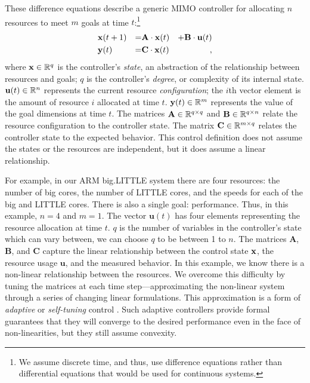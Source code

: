 These difference equations describe a generic MIMO controller for
allocating $n$ resources to meet $m$ goals at time $t$:\footnote{We
  assume discrete time, and thus, use difference equations rather than
  differential equations that would be used for continuous systems.}
\begin{equation}
\begin{aligned}
&\mathbf{x}(t+1) &=& \mathbf{A} \cdot \mathbf{x}(t)& + \mathbf{B} \cdot \mathbf{u}(t)\\
&\mathbf{y}(t)   &=& \mathbf{C} \cdot \mathbf{x}(t)&,
\end{aligned}
\label{eqn:system:mimo}
\end{equation}
where $\mathbf{x} \in \mathbb{R}^{q}$ is the controller's \emph{state}, an abstraction
of the relationship between resources and goals; $q$ is the
controller's \emph{degree}, or complexity of its internal state.
$\mathbf{u}(t) \in \mathbb{R}^n$ represents the current resource
\emph{configuration}; \ie{} the $i$th vector element is the amount of
resource $i$ allocated at time $t$.  $\mathbf{y}(t) \in \mathbb{R}^{m}$ represents the
value of the goal dimensions at time $t$. The matrices $\mathbf{A} \in
\mathbb{R}^{q \times q}$ and $\mathbf{B} \in \mathbb{R}^{q \times n}$ relate the
resource configuration to the controller state.  The matrix
$\mathbf{C} \in \mathbb{R}^{m \times q}$ relates the controller state to the
expected behavior.  This control definition does not assume the states
or the resources are independent, but it does assume a linear
relationship.

For example, in our ARM big.LITTLE system there are four resources:
the number of big cores, the number of LITTLE cores, and the speeds
for each of the big and LITTLE cores.  There is also a single goal:
performance.  Thus, in this example, $n=4$ and $m=1$. The vector
$\mathbf{u}(t)$ has four elements representing the resource allocation
at time $t$. $q$ is the number of variables in the controller's state
which can vary between, we can choose $q$ to be between 1 to $n$.  The
matrices $\mathbf{A}$, $\mathbf{B}$, and $\mathbf{C}$ capture the
linear relationship between the control state $\mathbf{x}$, the resource usage
$\mathbf{u}$, and the measured behavior.  In this example, we know
there is a non-linear relationship between the resources.  We overcome
this difficulty by tuning the matrices at each time
step---approximating the non-linear system through a series of
changing linear formulations.  This approximation is a form of
\emph{adaptive} or \emph{self-tuning} control \cite{HandbookControl}.
Such adaptive controllers provide formal guarantees that they will
converge to the desired performance even in the face of
non-linearities, but they still assume convexity.


